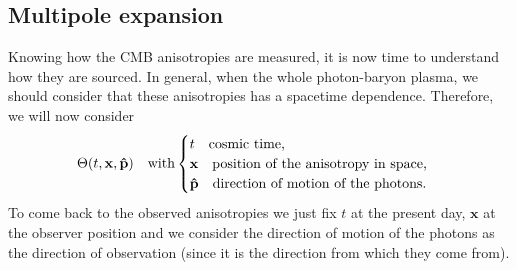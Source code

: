 \subsection{Multipole expansion}\label{sec:MultipoleExpansion}
Knowing how the CMB anisotropies are measured, it is now time to understand how they are sourced. In general, when the whole photon-baryon plasma, we should consider that these anisotropies has a spacetime dependence. Therefore, we will now consider
\begin{equation}
    \Theta({t,\mathbf x,\mathbf{\hat{p}}})\quad\text{with}
    \begin{cases}
        t\quad\text{cosmic time,}\\
        \mathbf x\quad\text{position of the anisotropy in space,}\\
        \mathbf{\hat{p}}\quad\text{direction of motion of the photons}.
    \end{cases}
\end{equation}
To come back to the observed anisotropies we just fix $t$ at the present day, $\mathbf x$ at the observer position and we consider the direction of motion of the photons as the direction of observation (since it is the direction from which they come from).

